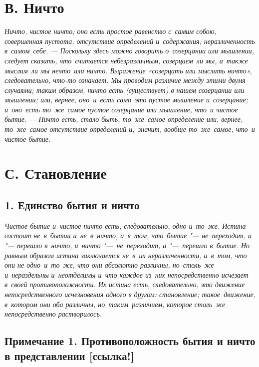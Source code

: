 \section*{В. Ничто}
\em{Ничто}, \em{чистое ничто}; оно
есть простое равенство с~самим собою, совершенная пустота, отсутствие
определений и~содержания; неразличенность в~самом~себе. --- Поскольку
здесь можно говорить о~созерцании или мышлении, следует сказать,
что~считается небезразличным, созерцаем~ли мы, а~также мыслим~ли мы
нечто~или \em{ничто}. Выражение «созерцать или мыслить ничто»,
следовательно, что-то означает. Мы проводим различие между этими двумя
случаями; таким образом, ничто \em{есть} (существует)
в нашем созерцании или мышлении; или, вернее, оно~и~есть само~это пустое
мышление и~созерцание; и~оно~есть то~же~самое пустое созерцание или
мышление, что~и чистое бытие. --- Ничто есть, стало быть, то~же~самое
определение или, вернее, то~же~самое отсутствие определений и,~значит,
вообще то~же~самое, что~и чистое \em{бытие}.

\section*{С. Становление}
\subsection{1. Единство бытия и ничто}
\em{Чистое бытие и~чистое ничто есть},
\em{следовательно}, \em{одно и~то~же}.
Истина состоит не~в~бытии и~не~в~ничто, а~в~том, что~бытие "---
не~переходит, а "--- перешло в~ничто, и~ничто "---~не~переходит,
а "---~перешло в~бытие. Но равным образом истина заключается
не~в~их неразличенности, а~в~том, что \em{они не одно~и~то~же}, что
\em{они абсолютно различны}, но~столь~же и~нераздельны
и~неотделимы и~что \em{каждое} из~них непосредственно
\em{исчезает в~своей противоположности}. Их истина
есть, следовательно, это \em{движение}
непосредственного исчезновения одного в другом:
\em{становление}; такое~движение, в~котором они оба
различны, но~таким~различием, которое столь~же непосредственно
растворилось.

\subsection{Примечание 1. Противоположность бытия и ничто
  в представлении [ссылка!]}

